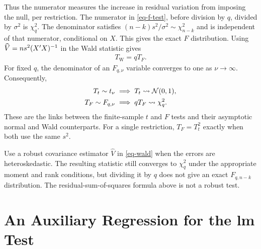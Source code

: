 \documentclass[a4paper,12pt]{article}
\begin{document}
Thus the numerator measures the increase in residual variation from imposing the null, per restriction.
The numerator in \eqref{eq-f-test}, before division by $q$, divided by $\sigma^2$ is $\chi_q^2$.
The denominator satisfies $(n-k)s^2/\sigma^2\sim\chi_{n-k}^2$ and is independent of that numerator, conditional on $X$.
This gives the exact $F$ distribution.
Using $\widehat V=n s^2(X^{\prime} X)^{-1}$ in the Wald statistic gives
\begin{align}
	T_{\mathrm W}=qT_F.
\end{align}
For fixed $q$, the denominator of an $F_{q,\nu}$ variable converges to one as $\nu\to\infty$.
Consequently,
\begin{align}
	T_t\sim t_\nu &\implies T_t\overset{}{\leadsto}\operatorname{\mathcal{N}}(0,1),\\
	T_F\sim F_{q,\nu} &\implies qT_F\overset{}{\leadsto}\chi_q^2.
\end{align}
These are the links between the finite-sample $t$ and $F$ tests and their asymptotic normal and Wald counterparts.
For a single restriction, $T_F=T_t^2$ exactly when both use the same $s^2$.

\begin{remark}[Heteroskedasticity]
	Use a robust covariance estimator $\widehat V$ in \eqref{eq-wald} when the errors are heteroskedastic.
	The resulting statistic still converges to $\chi_q^2$ under the appropriate moment and rank conditions,
	but dividing it by $q$ does not give an exact $F_{q,n-k}$ distribution.
	The residual-sum-of-squares formula above is not a robust test.
\end{remark}

\section{An Auxiliary Regression for the \texorpdfstring{\gls{lm}}{LM} Test}\label{sec-lm-auxiliary}
\end{document}
